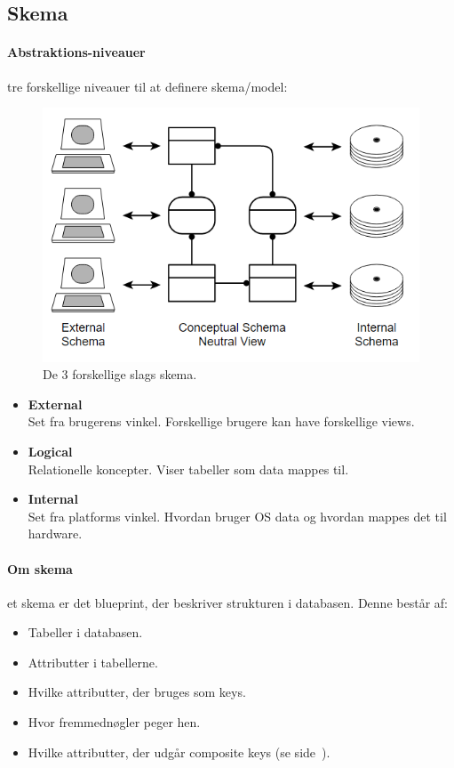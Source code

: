 \subsection{Skema}

\paragraph{Abstraktions-niveauer} tre forskellige niveauer til at definere skema/model:

\begin{figure}[h]
\centering
\includegraphics[width=0.7\linewidth]{figs/spm2/skema}
\caption{De 3 forskellige slags skema.}
\label{fig:skema}
\end{figure}


\begin{itemize}
	\item \textbf{External}\\
	Set fra brugerens vinkel. Forskellige brugere kan have forskellige views.
	\item \textbf{Logical}\\
	Relationelle koncepter. Viser tabeller som data mappes til.
	\item \textbf{Internal}\\
	Set fra platforms vinkel. Hvordan bruger OS data og hvordan mappes det til hardware.
\end{itemize}

\paragraph{Om skema} et skema er det blueprint, der beskriver strukturen i databasen. Denne består af:

\begin{itemize}
	\item Tabeller i databasen.
	\item Attributter i tabellerne.
	\item Hvilke attributter, der bruges som keys.
	\item Hvor fremmednøgler peger hen.
	\item Hvilke attributter, der udgår composite keys (se side~\pageref{sec:keys}).
\end{itemize}

